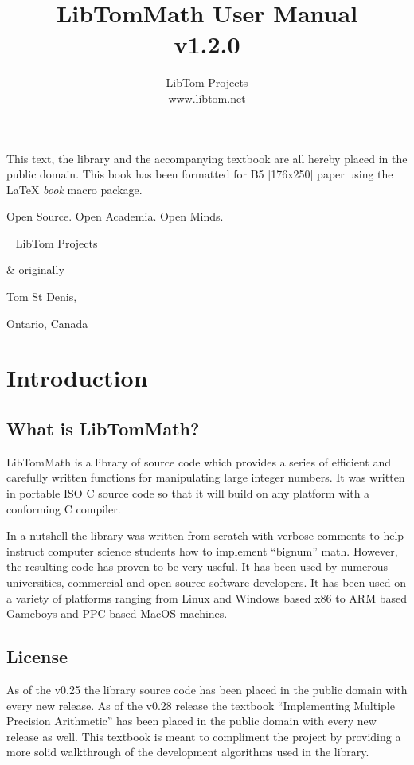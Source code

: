 \documentclass[synpaper]{book}
\begin{document}
\frontmatter
\pagestyle{empty}
\title{LibTomMath User Manual \\ v1.2.0}
\author{LibTom Projects \\ www.libtom.net}
\maketitle
This text, the library and the accompanying textbook are all hereby placed in the public domain.  This book has been
formatted for B5 [176x250] paper using the \LaTeX{} {\em book} macro package.

\vspace{10cm}

\begin{flushright}Open Source.  Open Academia.  Open Minds.

\mbox{ }
LibTom Projects

\& originally

Tom St Denis,

Ontario, Canada
\end{flushright}

\tableofcontents
\listoffigures
\mainmatter
\pagestyle{headings}
\chapter{Introduction}
\section{What is LibTomMath?}
LibTomMath is a library of source code which provides a series of efficient and carefully written functions for manipulating
large integer numbers.  It was written in portable ISO C source code so that it will build on any platform with a conforming
C compiler.

In a nutshell the library was written from scratch with verbose comments to help instruct computer science students how
to implement ``bignum'' math.  However, the resulting code has proven to be very useful.  It has been used by numerous
universities, commercial and open source software developers.  It has been used on a variety of platforms ranging from
Linux and Windows based x86 to ARM based Gameboys and PPC based MacOS machines.

\section{License}
As of the v0.25 the library source code has been placed in the public domain with every new release.  As of the v0.28
release the textbook ``Implementing Multiple Precision Arithmetic'' has been placed in the public domain with every new
release as well.  This textbook is meant to compliment the project by providing a more solid walkthrough of the development
algorithms used in the library.
\end{document}
